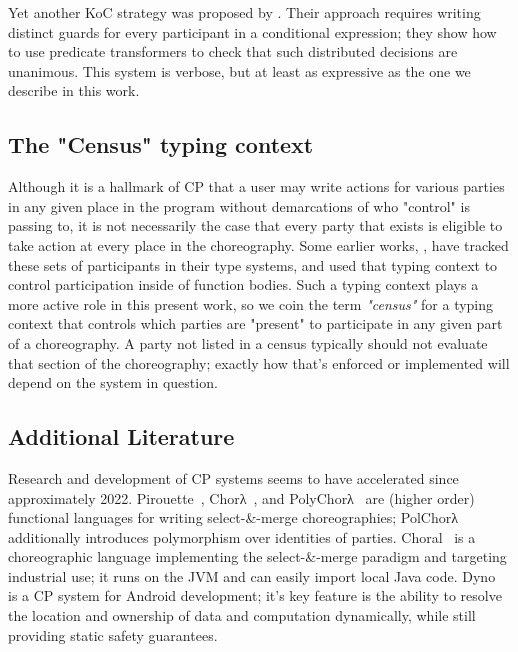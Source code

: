 Yet another KoC strategy was proposed by \cite{jongmans2022predicates}.
Their approach requires writing distinct guards for every
participant in a conditional expression; they show how to use predicate transformers to check that
such distributed decisions are unanimous.
This system is verbose, but at least as expressive as the one we describe in this work.

\subsection{The "Census" typing context}
\label{sec:census}
Although it is a hallmark of CP that a user may write actions for various parties in any given place in the program
without demarcations of who "control" is passing to,
it is not necessarily the case that every party that exists is eligible to take action at every place in the choreography.
Some earlier works, \eg \cite{chor-lambda}, have tracked these sets of participants in their type systems,
and used that typing context to control participation inside of function bodies.
Such a typing context plays a more active role in this present work, so we coin the term \emph{"census"}
for a typing context that controls which parties are "present" to participate in any given part of a choreography.
A party not listed in a census typically should not evaluate that section of the choreography;
exactly how that's enforced or implemented will depend on the system in question.

\subsection{Additional Literature}
\label{sec:modern-work}

Research and development of CP systems seems to have accelerated since approximately 2022.
Pirouette~\cite{hirsch2021pirouette}, Chorλ~\cite{chor-lambda},
and  PolyChorλ~\cite{graversen2023polychor}
are (higher order) functional languages for writing select-\&-merge choreographies;
PolChorλ additionally introduces polymorphism over identities of parties.
Choral~\cite{giallorenzo-choral} is a choreographic language implementing the select-\&-merge paradigm
and targeting industrial use;
it runs on the JVM and can easily import local Java code.
Dyno~\cite{zakhour23} is a CP system for Android development;
it's key feature is the ability to resolve the location and ownership of data and computation dynamically,
while still providing static safety guarantees.

